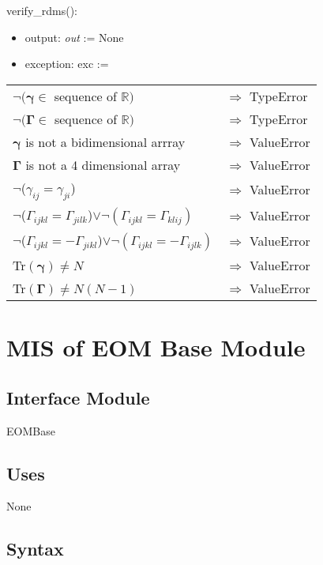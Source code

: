 \documentclass[12pt, titlepage]{article}
\begin{document}
\noindent verify\_rdms():
\begin{itemize}
	\item output: \textit{out} := None
	\item exception: exc := 
\end{itemize}
\noindent \begin{longtable*}[l]{l l}
	$\neg(\boldsymbol{\gamma}\in$ sequence of $\mathbb{R})$ & $\Rightarrow$ 
	TypeError\\
	$\neg(\boldsymbol{\Gamma}\in$ sequence of $\mathbb{R})$ & $\Rightarrow$ 
	TypeError\\
	$\boldsymbol{\gamma}$ is not a bidimensional arrray  & $\Rightarrow$ 
	ValueError\\
	$\boldsymbol{\Gamma}$ is not a 4 dimensional array& $\Rightarrow$ 
	ValueError\\
	$\neg$($\gamma_{ij} = \gamma_{ji}$) & $\Rightarrow$ 
	ValueError\\
	$\neg$($\Gamma_{ijkl} = \Gamma_{jilk}$)$\lor \neg(\Gamma_{ijkl} = 
	\Gamma_{klij})$ & 
	$\Rightarrow$ 
	ValueError\\
	$\neg$($\Gamma_{ijkl} = -\Gamma_{jikl}$)$\lor \neg(\Gamma_{ijkl} = 
	-\Gamma_{ijlk})$ & 
	$\Rightarrow$ 
	ValueError\\
	Tr$(\boldsymbol{\gamma}) \neq N$ & $\Rightarrow$ 
	ValueError\\
	Tr$(\boldsymbol{\Gamma}) \neq N(N-1)$ & $\Rightarrow$ 
	ValueError\\
\end{longtable*}

\newpage

\section{MIS of EOM Base Module} \label{mEOM}

\subsection{Interface Module}

EOMBase

\subsection{Uses}
None

\subsection{Syntax}
\end{document}
